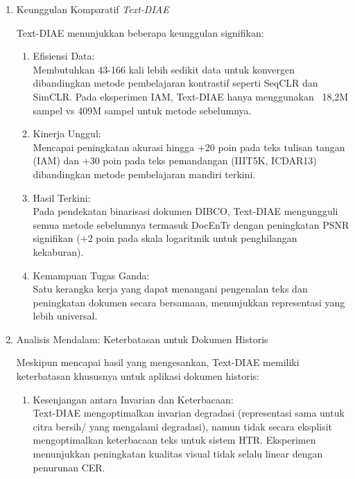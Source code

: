 \begin{enumerate}[leftmargin=*, labelsep=0.5em, itemindent=0pt, label=\arabic*., topsep=0pt, partopsep=0pt]
\item Keunggulan Komparatif \textit{Text-DIAE}
\label{para:textdiae-keunggulan}

Text-DIAE menunjukkan beberapa keunggulan signifikan:

\begin{enumerate}[leftmargin=1.5em, labelsep=0.5em, itemindent=0pt, label=\alph*., topsep=0pt, parsep=0pt, itemsep=0pt]
      \item Efisiensi Data: \mbox{}\\[0.1em]
            Membutuhkan 43-166 kali lebih sedikit data untuk konvergen dibandingkan metode pembelajaran kontrastif seperti SeqCLR dan SimCLR. Pada eksperimen IAM, Text-DIAE hanya menggunakan ~18,2M sampel vs 409M sampel untuk metode sebelumnya.

      \item Kinerja Unggul: \mbox{}\\[0.1em]
            Mencapai peningkatan akurasi hingga +20 poin pada teks tulisan tangan (IAM) dan +30 poin pada teks pemandangan (IIIT5K, ICDAR13) dibandingkan metode pembelajaran mandiri terkini.

      \item Hasil Terkini: \mbox{}\\[0.1em]
            Pada pendekatan binarisasi dokumen DIBCO, Text-DIAE mengungguli semua metode sebelumnya termasuk DocEnTr dengan peningkatan PSNR signifikan (+2 poin pada skala logaritmik untuk penghilangan kekaburan).

      \item Kemampuan Tugas Ganda: \mbox{}\\[0.1em]
            Satu kerangka kerja yang dapat menangani pengenalan teks dan peningkatan dokumen secara bersamaan, menunjukkan representasi yang lebih universal.
\end{enumerate}

\item Analisis Mendalam: Keterbatasan untuk Dokumen Historis

Meskipun mencapai hasil yang mengesankan, Text-DIAE memiliki keterbatasan khususnya untuk aplikasi dokumen historis:

\begin{enumerate}[leftmargin=1.5em, labelsep=0.5em, itemindent=0pt, label=\alph*., topsep=0pt, parsep=0pt, itemsep=0pt]
      \item Kesenjangan antara Invarian dan Keterbacaan: \mbox{}\\[0.1em]
            Text-DIAE mengoptimalkan invarian degradasi (representasi sama untuk citra bersih/ yang mengalami degradasi), namun tidak secara eksplisit mengoptimalkan keterbacaan teks untuk sistem HTR. Eksperimen menunjukkan peningkatan kualitas visual tidak selalu linear dengan penurunan CER.


\end{enumerate}
\end{enumerate}
